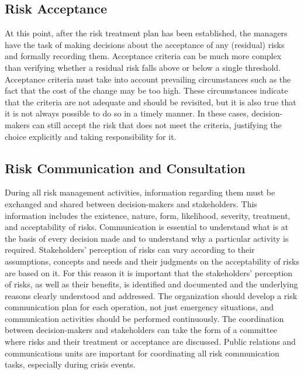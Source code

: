 \subsection{Risk Acceptance}
At this point, after the risk treatment plan has been established, the managers have the task of making decisions about the acceptance of any (residual) risks and formally recording them. Acceptance criteria can be much more complex than verifying whether a residual risk falls above or below a single threshold. Acceptance criteria must take into account prevailing circumstances such as the fact that the cost of the change may be too high. These circumstances indicate that the criteria are not adequate and should be revisited, but it is also true that it is not always possible to do so in a timely manner. In these cases, decision-makers can still accept the risk that does not meet the criteria, justifying the choice explicitly and taking responsibility for it.
\subsection{Risk Communication and Consultation}
During all risk management activities, information regarding them must be exchanged and shared between decision-makers and stakeholders. This information includes the existence, nature, form, likelihood, severity, treatment, and acceptability of risks. Communication is essential to understand what is at the basis of every decision made and to understand why a particular activity is required. Stakeholders' perception of risks can vary according to their assumptions, concepts and needs and their judgments on the acceptability of risks are based on it. For this reason it is important that the stakeholders' perception of risks, as well as their benefits, is identified and documented and the underlying reasons clearly understood and addressed. The organization should develop a risk communication plan for each operation, not just emergency situations, and communication activities should be performed continuously. The coordination between decision-makers and stakeholders can take the form of a committee where risks and their treatment or acceptance are discussed. Public relations and communications units are important for coordinating all risk communication tasks, especially during crisis events.
